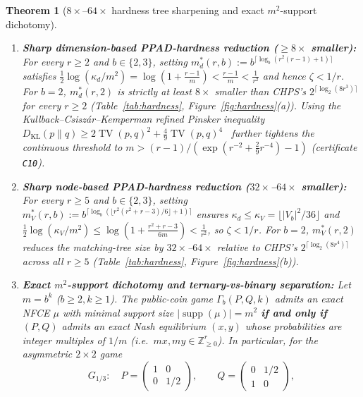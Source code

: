 \documentclass[11pt,a4paper]{article}
\newtheorem{theorem}{Theorem}
\theoremstyle{remark}
\newcommand{\supp}{\operatorname{supp}}
\newcommand{\TV}{\operatorname{TV}}
\newcommand{\DKL}{D_{\mathrm{KL}}}
\newcommand{\Z}{\mathbb{Z}}
\begin{document}
\begin{theorem}[$8\times$--$64\times$ hardness tree sharpening and exact $m^2$-support dichotomy]\label{thm:hardness}
\leavevmode
\begin{enumerate}
  \item[\textup{(a)}] \textbf{Sharp dimension-based PPAD-hardness reduction ($\ge 8\times$ smaller):} For every $r \ge 2$ and $b \in \{2, 3\}$, setting $m_d^*(r,b) := b^{\lceil \log_b(r^2(r-1)+1)\rceil}$ satisfies $\frac{1}{2}\log(\kappa_d/m^2) = \log(1 + \frac{r-1}{m}) < \frac{r-1}{m} < \frac{1}{r^2}$ and hence $\zeta < 1/r$. For $b=2$, $m_d^*(r,2)$ is strictly at least $8\times$ smaller than CHPS's $2^{\lceil\log_2(8r^3)\rceil}$ for every $r \ge 2$ (Table~\ref{tab:hardness}, Figure~\ref{fig:hardness}(a)). Using the Kullback--Csisz\'ar--Kemperman refined Pinsker inequality $\DKL(p\|q) \ge 2\TV(p,q)^2 + \frac{4}{9}\TV(p,q)^4$~\cite{FHT2003} further tightens the continuous threshold to $m > (r-1)/(\exp(r^{-2} + \frac{2}{9}r^{-4}) - 1)$ (certificate \texttt{C10}).
  \item[\textup{(b)}] \textbf{Sharp node-based PPAD-hardness reduction ($32\times$--$64\times$ smaller):} For every $r \ge 5$ and $b \in \{2, 3\}$, setting $m_V^*(r,b) := b^{\lceil \log_b(\lfloor r^2(r^2+r-3)/6\rfloor + 1)\rceil}$ ensures $\kappa_d \le \kappa_V = \lfloor |V_b|^2/36\rfloor$ and $\frac{1}{2}\log(\kappa_V/m^2) \le \log(1 + \frac{r^2+r-3}{6m}) < \frac{1}{r^2}$, so $\zeta < 1/r$. For $b=2$, $m_V^*(r,2)$ reduces the matching-tree size by $32\times$--$64\times$ relative to CHPS's $2^{\lceil\log_2(8r^4)\rceil}$ across all $r \ge 5$ (Table~\ref{tab:hardness}, Figure~\ref{fig:hardness}(b)).
  \item[\textup{(c)}] \textbf{Exact $m^2$-support dichotomy and ternary-vs-binary separation:} Let $m = b^k$ ($b \ge 2, k \ge 1$). The public-coin game $\Gamma_b(P,Q,k)$ admits an exact NFCE $\mu$ with minimal support size $|\supp(\mu)| = m^2$ \textbf{if and only if} $(P,Q)$ admits an exact Nash equilibrium $(x,y)$ whose probabilities are integer multiples of $1/m$ (i.e.\ $m x, m y \in \Z_{\ge 0}^r$). In particular, for the asymmetric $2{\times}2$ game
  \begin{equation}\label{eq:G_third}
    G_{1/3}:\quad P = \begin{pmatrix} 1 & 0 \\ 0 & 1/2 \end{pmatrix}, \qquad Q = \begin{pmatrix} 0 & 1/2 \\ 1 & 0 \end{pmatrix},

\end{equation}
\end{enumerate}
\end{theorem}
\end{document}
